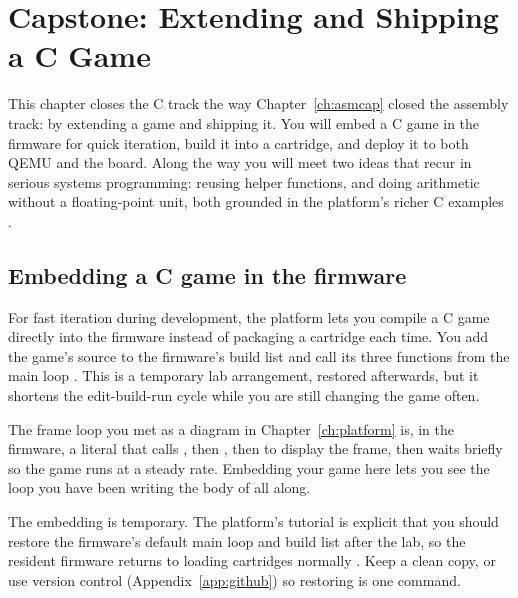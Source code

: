 \chapter{Capstone: Extending and Shipping a C Game}
\label{ch:ccap}

This chapter closes the C track the way Chapter~\ref{ch:asmcap} closed the
assembly track: by extending a game and shipping it. You will embed a C game in
the firmware for quick iteration, build it into a  cartridge, and
deploy it to both QEMU and the board. Along the way you will meet two ideas that
recur in serious systems programming: reusing helper functions, and doing
arithmetic without a floating-point unit, both grounded in the platform's richer
C examples \citep{prg32tutorialc,prg32repo}.

\section{Embedding a C game in the firmware}

For fast iteration during development, the platform lets you compile a C game
directly into the firmware instead of packaging a cartridge each time. You add the
game's source to the firmware's build list and call its three functions from the
main loop \citep{prg32tutorialc}. This is a temporary lab arrangement, restored
afterwards, but it shortens the edit-build-run cycle while you are still changing
the game often.



\begin{prgconcept}
The frame loop you met as a diagram in Chapter~\ref{ch:platform} is, in the
firmware, a literal  that calls , then ,
then  to display the frame, then waits briefly so the
game runs at a steady rate. Embedding your game here lets you see the loop you have
been writing the body of all along.
\end{prgconcept}

\begin{prgwarn}
The embedding is temporary. The platform's tutorial is explicit that you should
restore the firmware's default main loop and build list after the lab, so the
resident firmware returns to loading cartridges normally \citep{prg32tutorialc}.
Keep a clean copy, or use version control (Appendix~\ref{app:github}) so restoring
is one command.
\end{prgwarn}

